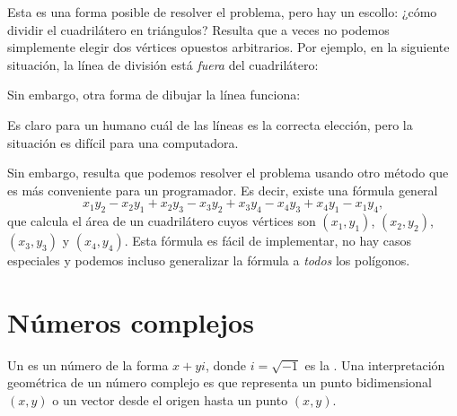 Esta es una forma posible de resolver el problema,
pero hay un escollo:
¿cómo dividir el cuadrilátero en triángulos?
Resulta que a veces no podemos simplemente elegir
dos vértices opuestos arbitrarios.
Por ejemplo, en la siguiente situación,
la línea de división está \emph{fuera} del cuadrilátero:
\begin{center}
\end{center}
Sin embargo, otra forma de dibujar la línea funciona:
\begin{center}
\end{center}
Es claro para un humano cuál de las líneas es la correcta
elección, pero la situación es difícil para una computadora.
                           
Sin embargo, resulta que podemos resolver el problema usando
otro método que es más conveniente para un programador.
Es decir, existe una fórmula general
\[x_1y_2-x_2y_1+x_2y_3-x_3y_2+x_3y_4-x_4y_3+x_4y_1-x_1y_4,\]
que calcula el área de un cuadrilátero
cuyos vértices son
$(x_1,y_1)$,
$(x_2,y_2)$,
$(x_3,y_3)$ y
$(x_4,y_4)$.
Esta fórmula es fácil de implementar, no hay casos especiales
y podemos incluso generalizar la fórmula
a \emph{todos} los polígonos.

\section{Números complejos}


Un  es un número de la forma $x+y i$,
donde $i = \sqrt{-1}$ es la .
Una interpretación geométrica de un número complejo es
que representa un punto bidimensional $(x,y)$
o un vector desde el origen hasta un punto $(x,y)$.

